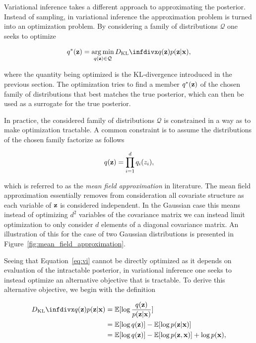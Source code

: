 Variational inference takes a different approach to approximating the posterior. Instead of sampling, in variational inference the approximation problem is turned into an optimization problem. By considering a family of distributions $\mathcal{Q}$ one seeks to optimize

\begin{equation}
q^{*}(\bz) = \argmin_{q(\bz) \in \mathcal{Q}} \dkl{q(\bz)}{p(\bz \vert \bx)},
\label{eq:vi}
\end{equation}

where the quantity being optimized is the KL-divergence introduced in the previous section. The optimization tries to find a member $q^{*}(\mathbf{z})$ of the chosen family of distributions that best matches the true posterior, which can then be used as a surrogate for the true posterior.

In practice, the considered family of distributions $\mathcal{Q}$ is constrained in a way as to make optimization tractable. A common constraint is to assume the distributions of the chosen family factorize as follows

$$q(\mathbf{z}) = \prod_{i=1}^{d} q_{i}(z_{i}),$$

which is referred to as the \textit{mean field approximation} in literature. The mean field approximation essentially removes from consideration all covariate structure as each variable of $\mathbf{z}$ is considered independent. In the Gaussian case this means instead of optimizing $d^2$ variables of the covariance matrix we can instead limit optimization to only consider $d$ elements of a diagonal covariance matrix. An illustration of this for the case of two Gaussian distributions is presented in Figure~\ref{fig:mean_field_approximation}.

Seeing that Equation~\ref{eq:vi} cannot be directly optimized as it depends on evaluation of the intractable posterior, in variational inference one seeks to instead optimize an alternative objective that is tractable. To derive this alternative objective, we begin with the definition

\begin{equation}
\begin{aligned}
\dkl{q(\bz)}{p(\bz \vert \bx)} &= \mathbb{E}[\log \frac{q(\bz)}{p(\bz \vert \bx)}] \\
                               &= \mathbb{E}[\log q(\bz)] - \mathbb{E}[\log p(\bz \vert \bx)] \\
                               &= \mathbb{E}[\log q(\bz)] - \mathbb{E}[\log p(\bz, \bx)] + \log p(\bx),
\end{aligned}
\end{equation}

